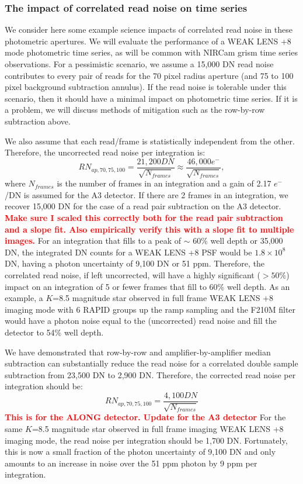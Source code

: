 \documentclass{aastex62}
\begin{document}
\subsubsection{The impact of correlated read noise on time series}
We consider here some example science impacts of correlated read noise in these photometric apertures.
We will evaluate the performance of a WEAK LENS +8 mode photometric time series, as will be common with NIRCam grism time series observations.
For a pessimistic scenario, we assume a 15,000 DN read noise contributes to every pair of reads for the 70 pixel radius aperture (and 75 to 100 pixel background subtraction annulus).
If the read noise is tolerable under this scenario, then it should have a minimal impact on photometric time series.
If it is a problem, we will discuss methods of mitigation such as the row-by-row subtraction above.

We also assume that each read/frame is statistically independent from the other.
Therefore, the uncorrected read noise per integration is:
\begin{equation}
RN_{ap,70,75,100} = \frac{21,200 DN}{ \sqrt{N_{frames}}} \approx \frac{46,000 e^-}{ \sqrt{N_{frames}}},
\end{equation}
where $N_{frames}$ is the number of frames in an integration and a gain of 2.17 $e^-$/DN is assumed for the A3 detector.
If there are 2 frames in an integration, we recover 15,000 DN for the case of a read pair subtraction on the A3 detector.
\textcolor{red}{\bf Make sure I scaled this correctly both for the read pair subtraction and a slope fit. Also empirically verify this with a slope fit to multiple images.}
For an integration that fills to a peak of $\sim$ 60\% well depth or 35,000 DN, the integrated DN counts for a WEAK LENS +8 PSF would be $1.8 \times10^8$ DN, having a photon uncertainty of 9,100 DN or 51 ppm.
Therefore, the correlated read noise, if left uncorrected, will have a highly significant ($>50\%$) impact on an integration of 5 or fewer frames that fill to 60\% well depth.
As an example, a $K$=8.5 magnitude star observed in full frame WEAK LENS +8 imaging mode with 6 RAPID groups up the ramp sampling and the F210M filter would have a photon noise equal to the (uncorrected) read noise and fill the detector to 54\% well depth.

We have demonstrated that row-by-row and amplifier-by-amplifier median subtraction can substantially reduce the read noise for a correlated double sample subtraction from 23,500 DN to 2,900 DN.
Therefore, the corrected read noise per integration should be:
\begin{equation}\label{bestRNCorrection}
RN_{ap,70,75,100} = \frac{4,100 DN}{ \sqrt{N_{frames}}}
\end{equation}
\textcolor{red}{\bf This is for the ALONG detector.
Update for the A3 detector}
For the same $K$=8.5 magnitude star observed in full frame imaging WEAK LENS +8 imaging mode, the read noise per integration should be 1,700 DN.
Fortunately, this is now a small fraction of the photon uncertainty of 9,100 DN and only amounts to an increase in noise over the 51 ppm photon by 9 ppm per integration.
\end{document}
